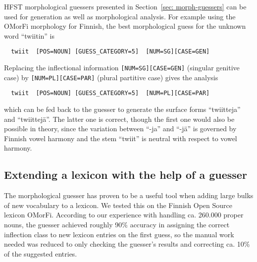 \documentclass{llncs}
\begin{document}
HFST morphological guessers presented in Section~\ref{sec:
  morph-guessers} can be used for generation as well as morphological
analysis. For example using the OMorFi morphology for Finnish, the
best morphological guess for the unknown word ``twiitin'' is
\begin{verbatim}
  twiit  [POS=NOUN] [GUESS_CATEGORY=5]  [NUM=SG][CASE=GEN]
\end{verbatim}
Replacing the inflectional information {\tt [NUM=SG][CASE=GEN]}
(singular genitive case) by {\tt [NUM=PL][CASE=PAR]} (plural
partitive case) gives the analysis
\begin{verbatim}
  twiit  [POS=NOUN] [GUESS_CATEGORY=5]  [NUM=PL][CASE=PAR]
\end{verbatim}
which can be fed back to the guesser to generate the surface forms
``twiitteja'' and ``twiittejä''. The latter one is correct, though the
first one would also be possible in theory, since the variation
between ``-ja'' and ``-jä'' is governed by Finnish vowel harmony and
the stem ``twiit'' is neutral with respect to vowel harmony.


\subsection{Extending a lexicon with the help of a guesser}

The morphological guesser has proven to be a useful tool when adding 
large bulks of new vocabulary to a lexicon. We tested this on the Finnish Open Source
lexicon OMorFi. According to our experience with handling ca. 260.000 proper nouns, the guesser achieved
roughly 90\% accuracy in assigning the correct inflection class to new
lexicon entries on the first guess, so the manual work needed was reduced to only
checking the guesser's results and correcting ca. 10\% of the suggested
entries. 
\end{document}
